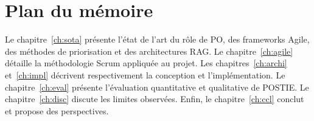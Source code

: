 \section{Plan du mémoire}
Le chapitre~\ref{ch:sota} présente l'état de l'art du rôle de PO,
des frameworks Agile, des méthodes de priorisation et des
architectures RAG. Le chapitre~\ref{ch:agile} détaille la
méthodologie Scrum appliquée au projet. Les chapitres~\ref{ch:archi}
et~\ref{ch:impl} décrivent respectivement la conception et
l'implémentation. Le chapitre~\ref{ch:eval} présente l'évaluation
quantitative et qualitative de POSTIE. Le chapitre~\ref{ch:disc}
discute les limites observées. Enfin, le chapitre~\ref{ch:ccl}
conclut et propose des perspectives.
